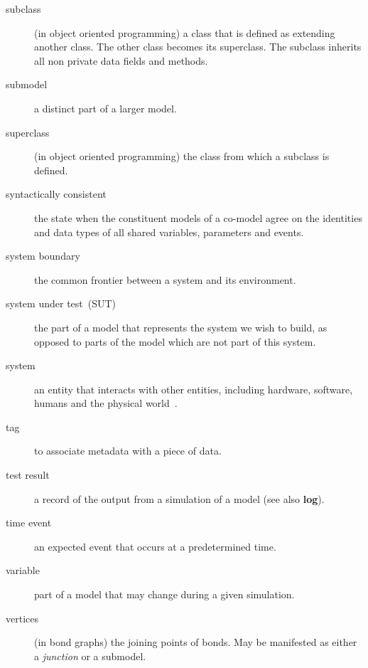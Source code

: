 \documentclass{crescendorepchap}
\begin{document}
\begin{description}
\item[subclass] (in object oriented programming) a class that is defined as extending another class.  The other class becomes its superclass.  The subclass inherits all non private data fields and methods.
\item[submodel] a distinct part of a larger model.
\item[superclass] (in object oriented programming) the class from which a subclass is defined.
\item[syntactically consistent] the state when the constituent models of a co-model agree on the identities and data types of all shared variables, parameters and events.
\item[system boundary] the common frontier between a system and its environment.
\item[system under test~(SUT)] the part of a model that represents the system we wish to build, as opposed to parts of the model which are not part of this system.
\item[system] an entity that interacts with other entities, including hardware, software, humans and the physical world~\cite{Avizienis&04}.
\item[tag] to associate metadata with a piece of data.
\item[test result] a record of the output from a simulation of a model (see also \textbf{log}).
\item[time event] an expected event that occurs at a predetermined time.
\item[variable] part of a model that may change during a given simulation.
\item[vertices] (in bond graphs) the joining points of bonds.  May be manifested as either a \textit{junction} or a submodel.
\end{description} 
\end{document}
